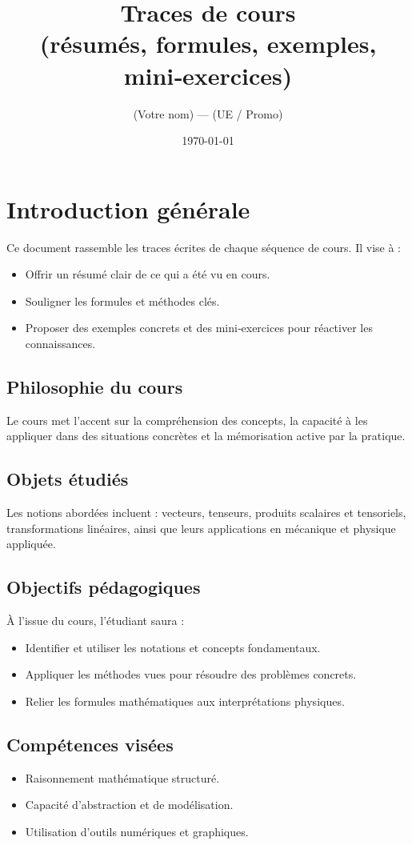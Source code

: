 \documentclass[11pt,a4paper]{report}
\title{\textbf{Traces de cours}\\\large (résumés, formules, exemples, mini‑exercices)}
\author{(Votre nom) — (UE / Promo)}
\date{\today}
\newenvironment{niceitemize}{\begin{itemize}\setlength{\itemsep}{0.25em}\color{Gray}}{\end{itemize}}
\begin{document}
\chapter*{Introduction générale}
Ce document rassemble les traces écrites de chaque séquence de cours. Il vise à :
\begin{niceitemize}
    \item Offrir un résumé clair de ce qui a été vu en cours.
    \item Souligner les formules et méthodes clés.
    \item Proposer des exemples concrets et des mini‑exercices pour réactiver les connaissances.
\end{niceitemize}
\section*{Philosophie du cours}
Le cours met l’accent sur la compréhension des concepts, la capacité à les appliquer dans des situations concrètes et la mémorisation active par la pratique.
\section*{Objets étudiés}
Les notions abordées incluent : vecteurs, tenseurs, produits scalaires et tensoriels, transformations linéaires, ainsi que leurs applications en mécanique et physique appliquée.
\section*{Objectifs pédagogiques}
À l’issue du cours, l’étudiant saura :
\begin{niceitemize}
    \item Identifier et utiliser les notations et concepts fondamentaux.
    \item Appliquer les méthodes vues pour résoudre des problèmes concrets.
    \item Relier les formules mathématiques aux interprétations physiques.
\end{niceitemize}
\section*{Compétences visées}
\begin{niceitemize}
    \item Raisonnement mathématique structuré.
    \item Capacité d’abstraction et de modélisation.
    \item Utilisation d’outils numériques et graphiques.
\end{niceitemize}
\end{document}
